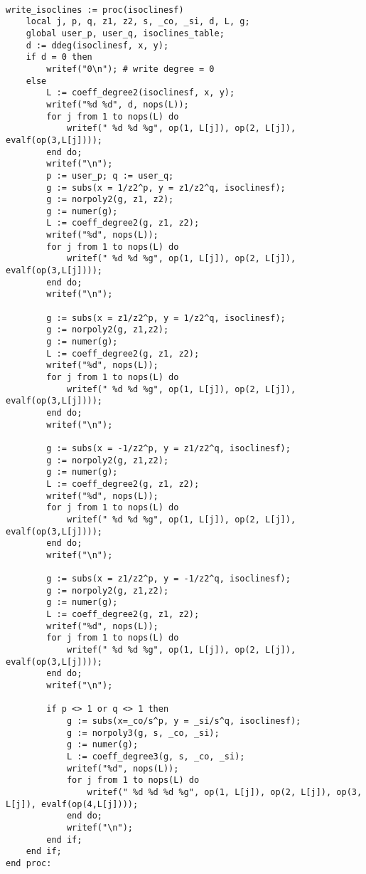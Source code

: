 \documentclass[a4paper,10pt]{article}
\begin{document}
\begin{lstlisting}[name=writelog3]

write_isoclines := proc(isoclinesf)
    local j, p, q, z1, z2, s, _co, _si, d, L, g;
    global user_p, user_q, isoclines_table;
    d := ddeg(isoclinesf, x, y);
    if d = 0 then
        writef("0\n"); # write degree = 0
    else
        L := coeff_degree2(isoclinesf, x, y);
        writef("%d %d", d, nops(L));
        for j from 1 to nops(L) do
            writef(" %d %d %g", op(1, L[j]), op(2, L[j]), evalf(op(3,L[j])));
        end do;
        writef("\n");
        p := user_p; q := user_q;
        g := subs(x = 1/z2^p, y = z1/z2^q, isoclinesf);
        g := norpoly2(g, z1, z2);
        g := numer(g);
        L := coeff_degree2(g, z1, z2);
        writef("%d", nops(L));
        for j from 1 to nops(L) do
            writef(" %d %d %g", op(1, L[j]), op(2, L[j]), evalf(op(3,L[j])));
        end do;
        writef("\n");

        g := subs(x = z1/z2^p, y = 1/z2^q, isoclinesf);
        g := norpoly2(g, z1,z2);
        g := numer(g);
        L := coeff_degree2(g, z1, z2);
        writef("%d", nops(L));
        for j from 1 to nops(L) do
            writef(" %d %d %g", op(1, L[j]), op(2, L[j]), evalf(op(3,L[j])));
        end do;
        writef("\n");

        g := subs(x = -1/z2^p, y = z1/z2^q, isoclinesf);
        g := norpoly2(g, z1,z2);
        g := numer(g);
        L := coeff_degree2(g, z1, z2);
        writef("%d", nops(L));
        for j from 1 to nops(L) do
            writef(" %d %d %g", op(1, L[j]), op(2, L[j]), evalf(op(3,L[j])));
        end do;
        writef("\n");

        g := subs(x = z1/z2^p, y = -1/z2^q, isoclinesf);
        g := norpoly2(g, z1,z2);
        g := numer(g);
        L := coeff_degree2(g, z1, z2);
        writef("%d", nops(L));
        for j from 1 to nops(L) do
            writef(" %d %d %g", op(1, L[j]), op(2, L[j]), evalf(op(3,L[j])));
        end do;
        writef("\n");

        if p <> 1 or q <> 1 then
            g := subs(x=_co/s^p, y = _si/s^q, isoclinesf);
            g := norpoly3(g, s, _co, _si);
            g := numer(g);
            L := coeff_degree3(g, s, _co, _si);
            writef("%d", nops(L));
            for j from 1 to nops(L) do
                writef(" %d %d %d %g", op(1, L[j]), op(2, L[j]), op(3, L[j]), evalf(op(4,L[j])));
            end do;
            writef("\n");
        end if;
    end if;
end proc:
\end{lstlisting}
\end{document}
